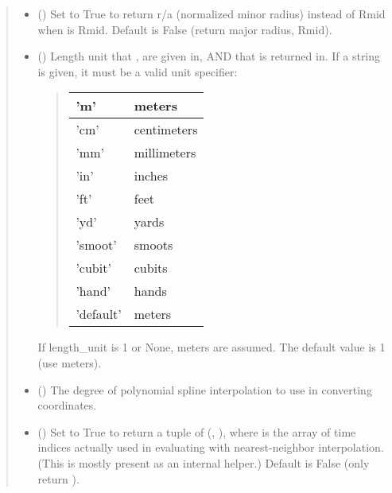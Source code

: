 \documentclass[letterpaper,10pt,english]{sphinxmanual}
\begin{document}
\begin{fulllineitems}
\begin{fulllineitems}
\begin{quote}
\begin{description}
\begin{itemize}
\item {} 
 () \textendash{} Set to True to return r/a (normalized minor radius)
instead of Rmid when  is Rmid. Default is False
(return major radius, Rmid).

\item {} 
 () \textendash{} 
Length unit that ,  are given in,
AND that  is returned in. If a string is given, it must
be a valid unit specifier:
\begin{quote}


\begin{savenotes}\sphinxattablestart
\centering
\begin{tabulary}{\linewidth}[t]{|T|T|}
\hline

’m’
&
meters
\\
\hline
’cm’
&
centimeters
\\
\hline
’mm’
&
millimeters
\\
\hline
’in’
&
inches
\\
\hline
’ft’
&
feet
\\
\hline
’yd’
&
yards
\\
\hline
’smoot’
&
smoots
\\
\hline
’cubit’
&
cubits
\\
\hline
’hand’
&
hands
\\
\hline
’default’
&
meters
\\
\hline
\end{tabulary}
\par
\sphinxattableend\end{savenotes}
\end{quote}

If length\_unit is 1 or None, meters are assumed. The default
value is 1 (use meters).


\item {} 
 () \textendash{} The degree of polynomial spline interpolation to
use in converting coordinates.

\item {} 
 () \textendash{} Set to True to return a tuple of (,
), where  is the array of time indices
actually used in evaluating  with nearest-neighbor
interpolation. (This is mostly present as an internal helper.)
Default is False (only return ).


\end{itemize}
\end{description}
\end{quote}
\end{fulllineitems}
\end{fulllineitems}
\end{document}

